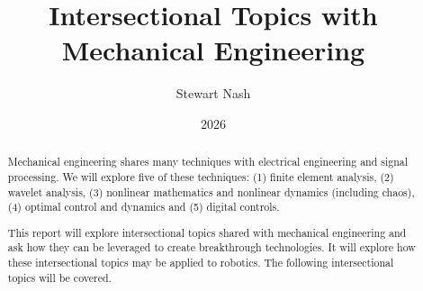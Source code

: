 \documentclass[11pt]{report}
\begin{document}
\title{Intersectional Topics with Mechanical Engineering}
\author{Stewart Nash}
\date{2026}

\maketitle

\begin{abstract}

Mechanical engineering shares many techniques with electrical engineering and signal processing. We will explore five of these techniques: (1) finite element analysis, (2) wavelet analysis, (3) nonlinear mathematics and nonlinear dynamics (including chaos), (4) optimal control and dynamics and (5) digital controls.

This report will explore intersectional topics shared with mechanical engineering and ask how they can be leveraged to create breakthrough technologies. It will explore how these intersectional topics may be applied to robotics. The following intersectional topics will be covered.


\end{abstract}
\end{document}
